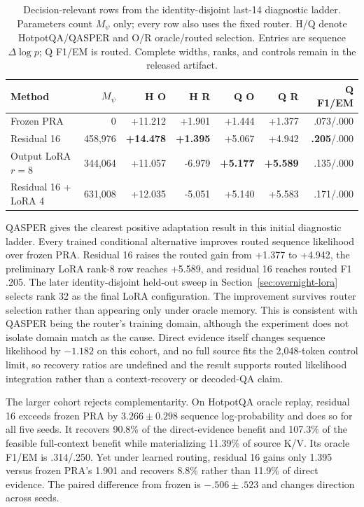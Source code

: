 \documentclass[11pt]{article}
\begin{document}
\begin{table}[H]
\centering
\scriptsize
\caption{Decision-relevant rows from the identity-disjoint last-14 diagnostic ladder. Parameters
count $M_\psi$ only; every row also uses the fixed router. H/Q denote HotpotQA/QASPER and O/R
oracle/routed selection. Entries are sequence $\Delta\log p$; Q F1/EM is routed. Complete widths,
ranks, and controls remain in the released artifact.}
\label{tab:last14-adaptation}
\begin{tabular}{lrrrrrr}
\toprule
Method & $M_\psi$ & H O & H R & Q O & Q R & Q F1/EM \\
\midrule
Frozen PRA & 0 & +11.212 & +1.901 & +1.444 & +1.377 & .073/.000 \\
Residual 16 & 458,976 & \textbf{+14.478} & \textbf{+1.395} & +5.067 & +4.942 & \textbf{.205}/.000 \\
Output LoRA $r=8$ & 344,064 & +11.057 & -6.979 & \textbf{+5.177} & \textbf{+5.589} & .135/.000 \\
Residual 16 + LoRA 4 & 631,008 & +12.035 & -5.051 & +5.140 & +5.583 & .171/.000 \\
\bottomrule
\end{tabular}
\end{table}

QASPER gives the clearest positive adaptation result in this initial diagnostic ladder. Every
trained conditional alternative improves routed sequence likelihood over frozen PRA. Residual 16
raises the routed gain from +1.377 to +4.942, the preliminary LoRA rank-8 row reaches +5.589, and
residual 16 reaches routed F1 .205. The later identity-disjoint held-out sweep in
Section~\ref{sec:overnight-lora} selects rank 32 as the final LoRA configuration.
The improvement survives router selection rather than appearing only under oracle memory. This is
consistent with QASPER being the router's training domain, although the experiment does not isolate
domain match as the cause. Direct evidence itself changes sequence likelihood by $-1.182$ on this
cohort, and no full source fits the 2,048-token control limit, so recovery ratios are undefined and
the result supports routed likelihood integration rather than a context-recovery or decoded-QA
claim.

The larger cohort rejects complementarity. On HotpotQA oracle replay, residual 16 exceeds frozen
PRA by $3.266\pm0.298$ sequence log-probability and does so for all five seeds. It recovers 90.8\%
of the direct-evidence benefit and 107.3\% of the feasible full-context benefit while materializing
11.39\% of source K/V. Its oracle F1/EM is .314/.250. Yet under learned routing, residual 16 gains
only 1.395 versus frozen PRA's 1.901 and recovers 8.8\% rather than 11.9\% of direct evidence.
The paired difference from frozen is $-.506\pm.523$ and changes direction across seeds.
\end{document}
